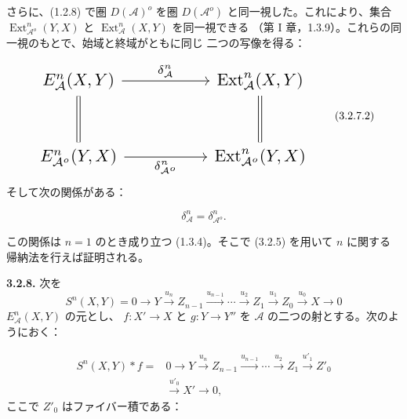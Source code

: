 \clearpage
{}%
\begingroup\small\setlength{\parskip}{0pt}\setlength{\emergencystretch}{1.5em}
\setlength{\abovedisplayskip}{4pt plus 2pt minus 2pt}%
\setlength{\belowdisplayskip}{4pt plus 2pt minus 2pt}%

さらに、(1.2.8) で圏 $D(\mathcal A)^o$ を圏
$D(\mathcal A^o)$ と同一視した。これにより、集合
$\operatorname{Ext}_{\mathcal A^o}^{n}(Y,X)$ と
$\operatorname{Ext}_{\mathcal A}^{n}(X,Y)$ を同一視できる
（第 I 章，1.3.9）。これらの同一視のもとで、始域と終域がともに同じ
二つの写像を得る：

\begin{equation}
\resizebox{0.74\textwidth}{!}{%
$\begin{tikzcd}[ampersand replacement=\&,column sep=5.0em,row sep=2.8em]
E_{\mathcal A}^{n}(X,Y)
  \arrow[r,"{\delta_{\mathcal A}^{n}}"]
  \arrow[d,equal]
\& \operatorname{Ext}_{\mathcal A}^{n}(X,Y)
  \arrow[d,equal] \\
E_{\mathcal A^o}^{n}(Y,X)
  \arrow[r,"{\delta_{\mathcal A^o}^{n}}"']
\& \operatorname{Ext}_{\mathcal A^o}^{n}(Y,X)
\end{tikzcd}$%
}
\tag{3.2.7.2}
\end{equation}
そして次の関係がある：

\begin{equation}
\delta_{\mathcal A}^{n}=\delta_{\mathcal A^o}^{n}.
\tag{3.2.7.3}
\end{equation}

この関係は $n=1$ のとき成り立つ (1.3.4)。そこで (3.2.5) を用いて
$n$ に関する帰納法を行えば証明される。

\medskip\noindent\textbf{3.2.8.}\quad
次を
\[
S^n(X,Y)=0\longrightarrow Y\xrightarrow{u_n}Z_{n-1}
\xrightarrow{u_{n-1}}\cdots\xrightarrow{u_2}Z_1
\xrightarrow{u_1}Z_0\xrightarrow{u_0}X\longrightarrow0
\]
$E_{\mathcal A}^{n}(X,Y)$ の元とし、
$f\colon X'\longrightarrow X$ と $g\colon Y\longrightarrow Y''$ を
$\mathcal A$ の二つの射とする。次のようにおく：

\begin{equation}
\begin{aligned}
S^n(X,Y)*f={}&0\longrightarrow Y\xrightarrow{u_n}Z_{n-1}
\xrightarrow{u_{n-1}}\cdots\xrightarrow{u_2}Z_1
\xrightarrow{u'_1}Z'_0\\
&\xrightarrow{u'_0}X'\longrightarrow0,
\end{aligned}
\tag{3.2.8.1}
\end{equation}
ここで $Z'_0$ はファイバー積である：


